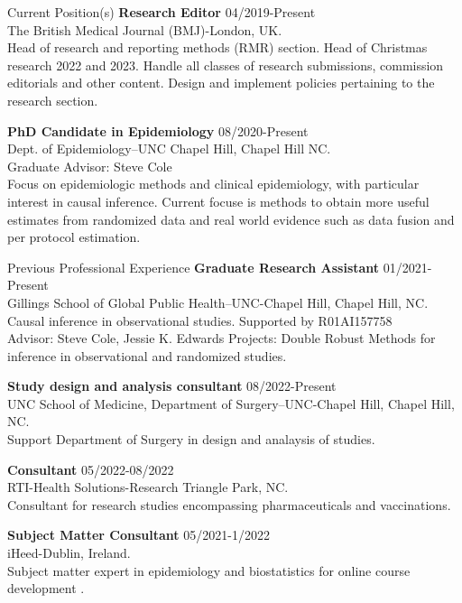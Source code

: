 \documentclass{resume} %
\begin{document}
\begin{rSection}{Current Position(s)}
{\bf Research Editor } \hfill {04/2019-Present}
\\ 
The British Medical Journal (BMJ)-London, UK. 
\\
 Head of research and reporting methods (RMR) section. Head of Christmas research 2022 and 2023. Handle all classes of research submissions, commission editorials and other content. Design and implement policies pertaining to the research section. 

{\bf PhD Candidate in Epidemiology} \hfill {08/2020-Present}
\\ 
Dept. of Epidemiology--UNC Chapel Hill, Chapel Hill NC. 
\\
Graduate Advisor: Steve Cole\\
Focus on epidemiologic methods and clinical epidemiology, with particular interest in causal inference. Current focuse is methods to obtain more useful estimates from randomized data and real world evidence such as data fusion and per protocol estimation.

\end{rSection}

   
\begin{rSection}{Previous Professional Experience}
   {\bf Graduate Research Assistant} \hfill {01/2021-Present}
   \\ 
   Gillings School of Global Public Health--UNC-Chapel Hill, Chapel Hill, NC. 
   \\
   Causal inference in observational studies. Supported by R01AI157758\\
   Advisor: Steve Cole, Jessie K. Edwards
   Projects: Double Robust Methods for inference in observational and randomized studies. 
   

   {\bf Study design and analysis consultant} \hfill {08/2022-Present}
   \\ 
   UNC School of Medicine, Department of Surgery--UNC-Chapel Hill, Chapel Hill, NC. 
   \\
   Support Department of Surgery in design and analaysis of studies.

   {\bf Consultant } \hfill {05/2022-08/2022}
   \\
   RTI-Health Solutions-Research Triangle Park, NC. 
   \\
   Consultant for research studies encompassing pharmaceuticals and vaccinations.

   {\bf Subject Matter Consultant } \hfill {05/2021-1/2022}
   \\
   iHeed-Dublin, Ireland. 
   \\
   Subject matter expert in epidemiology and biostatistics for online course development .
   
   \end{rSection}
\end{document}
